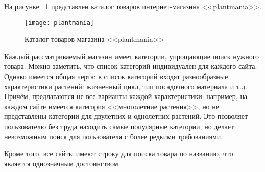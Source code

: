 На рисунке ~\ref{plantmania:image} представлен каталог товаров интернет-магазина <<plantmania>>.

\begin{figure}[h!]
	\texttt{[image: plantmania]}
	\caption{Каталог товаров магазина <<plantmania>>}
	\label{plantmania:image}
\end{figure}


Каждый рассматриваемый магазин имеет категории, упрощающие поиск нужного товара. Можно заметить, что список категорий индивидуален для каждого сайта. Однако имеется общая черта: в список категорий входят разнообразные характеристики растений: жизненный цикл, тип посадочного материала и т.д. Причём, предлагаются не все варианты каждой характеристики: например, на каждом сайте имеется категория <<многолетние растения>>, но не представлены категории для двулетних и однолетних растений. Это позволяет пользователю без труда находить самые популярные категории,  но делает невозможным поиск для пользователя с более редкими требованиями.

Кроме того, все сайты имеют строку для поиска товара по названию, что является однозначным достоинством.

